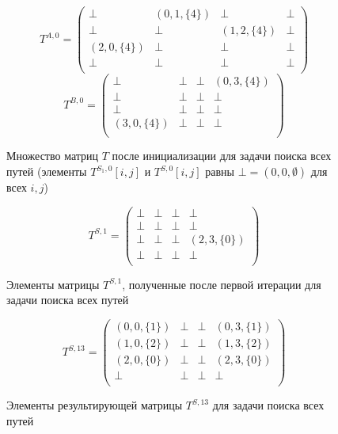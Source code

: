 {\small
	\begin{figure}[h]
		\[
		T^{A, 0} = \begin{pmatrix}
			\bot & (0, 1, \{4\})       & \bot & \bot       \\
			\bot & \bot & (1, 2, \{4\})       & \bot \\
			(2, 0, \{4\})       & \bot & \bot & \bot \\
			\bot       & \bot & \bot & \bot \\
		\end{pmatrix}
		\]
		\[
		T^{B, 0} = \begin{pmatrix}
			\bot & \bot       & \bot & (0, 3, \{4\})       \\
			\bot & \bot & \bot       & \bot \\
			\bot       & \bot & \bot & \bot \\
			(3, 0, \{4\})      & \bot & \bot & \bot \\
		\end{pmatrix}
		\]
		\caption{Множество матриц $T$ после инициализации для задачи поиска всех путей (элементы $T^{S_1, 0}[i, j]$ и $T^{S, 0}[i, j]$ равны $\bot = (0, 0, \emptyset)$ для всех $i, j$)}
		\label{ExampleQueryInitMatrixAll}
	\end{figure}
}

{\small
	\begin{figure}[h]
		\[
		T^{S, 1} = \begin{pmatrix}
			\bot & \bot       & \bot & \bot       \\
			\bot & \bot & \bot       & \bot \\
			\bot       & \bot & \bot & (2, 3, \{0\}) \\
			\bot       & \bot & \bot & \bot \\
		\end{pmatrix}
		\]
		\caption{Элементы матрицы $T^{S, 1}$, полученные после первой итерации для задачи поиска всех путей}
		\label{ExampleQueryFirstIterationAll}
	\end{figure}
}

{\small
	\begin{figure}[h]
		\[
		T^{S, 13} = \begin{pmatrix}
			(0, 0, \{1\}) & \bot       & \bot & (0, 3, \{1\})       \\
			(1, 0, \{2\}) & \bot & \bot       & (1, 3, \{2\}) \\
			(2, 0, \{0\})       & \bot & \bot & (2, 3, \{0\}) \\
			\bot       & \bot & \bot & \bot \\
		\end{pmatrix}
		\]
		\caption{Элементы результирующей матрицы $T^{S, 13}$ для задачи поиска всех путей}
		\label{ExampleQueryFinalMatricesAll}
	\end{figure}
}

